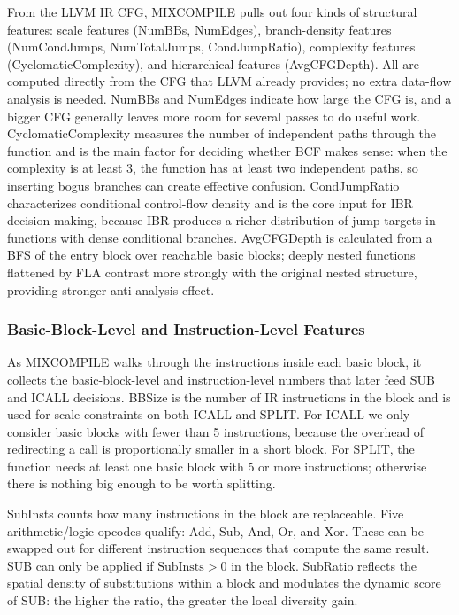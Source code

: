 \documentclass[5p,times,authoryear]{elsarticle}
\theoremstyle{plain}
\theoremstyle{definition}
\theoremstyle{remark}
\begin{document}
From the LLVM IR CFG, MIXCOMPILE pulls out four kinds of structural features: scale
features (NumBBs, NumEdges), branch-density features (NumCondJumps, NumTotalJumps,
CondJumpRatio), complexity features (CyclomaticComplexity), and hierarchical features
(AvgCFGDepth). All are computed directly from the CFG that LLVM already provides; no
extra data-flow analysis is needed. NumBBs and NumEdges indicate how large the CFG is,
and a bigger CFG generally leaves more room for several passes to do useful work.
CyclomaticComplexity measures the number of independent paths through the function and
is the main factor for deciding whether BCF makes sense: when the complexity is at
least 3, the function has at least two independent paths, so inserting bogus branches
can create effective confusion. CondJumpRatio characterizes conditional control-flow
density and is the core input for IBR decision making, because IBR produces a richer
distribution of jump targets in functions with dense conditional branches. AvgCFGDepth
is calculated from a BFS of the entry block over reachable basic blocks; deeply nested
functions flattened by FLA contrast more strongly with the original nested structure,
providing stronger anti-analysis effect.

\subsubsection{Basic-Block-Level and Instruction-Level Features}

As MIXCOMPILE walks through the instructions inside each basic block, it collects
the basic-block-level and instruction-level numbers that later feed SUB and ICALL
decisions. BBSize is the number of IR instructions in the block and is used for
scale constraints on both ICALL and SPLIT. For ICALL we only consider basic
blocks with fewer than 5 instructions, because the overhead of redirecting a call
is proportionally smaller in a short block. For SPLIT, the function needs at
least one basic block with 5 or more instructions; otherwise there is nothing
big enough to be worth splitting.

SubInsts counts how many instructions in the block are replaceable. Five
arithmetic/logic opcodes qualify: Add, Sub, And, Or, and Xor. These can be swapped out
for different instruction sequences that compute the same result. SUB can only be
applied if $\text{SubInsts} > 0$ in the block. SubRatio reflects the spatial density of
substitutions within a block and modulates the dynamic score of SUB: the higher the
ratio, the greater the local diversity gain.
\end{document}
